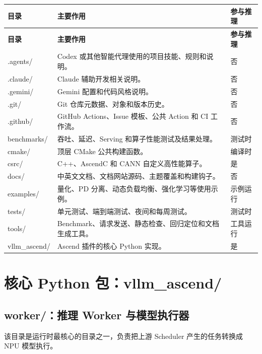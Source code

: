 \documentclass[UTF8,11pt,a4paper]{ctexart}
\DeclareRobustCommand{\folder}[1]{\texttt{\detokenize{#1}}}
\def\folder#1{#1}%
\begin{document}
\begin{longtable}{>{\raggedright\arraybackslash}p{} >{\raggedright\arraybackslash}p{} >{\centering\arraybackslash}p{}}
\toprule
\textbf{目录} & \textbf{主要作用} & \textbf{参与推理} \\
\midrule
\endfirsthead
\toprule
\textbf{目录} & \textbf{主要作用} & \textbf{参与推理} \\
\midrule
\endhead
\folder{.agents/} & Codex 或其他智能代理使用的项目技能、规则和说明。 & 否 \\
\folder{.claude/} & Claude 辅助开发相关说明。 & 否 \\
\folder{.gemini/} & Gemini 配置和代码风格说明。 & 否 \\
\folder{.git/} & Git 仓库元数据、对象和版本历史。 & 否 \\
\folder{.github/} & GitHub Actions、Issue 模板、公共 Action 和 CI 工作流。 & 否 \\
\folder{benchmarks/} & 吞吐、延迟、Serving 和算子性能测试及结果处理。 & 测试时 \\
\folder{cmake/} & 顶层 CMake 公共构建函数。 & 编译时 \\
\folder{csrc/} & C++、AscendC 和 CANN 自定义高性能算子。 & 是 \\
\folder{docs/} & 中英文文档、文档网站源码、主题覆盖和构建钩子。 & 否 \\
\folder{examples/} & 量化、PD 分离、动态负载均衡、强化学习等使用示例。 & 示例运行 \\
\folder{tests/} & 单元测试、端到端测试、夜间和每周测试。 & 测试时 \\
\folder{tools/} & Benchmark、请求发送、静态检查、回归定位和文档生成工具。 & 工具运行 \\
\folder{vllm_ascend/} & Ascend 插件的核心 Python 实现。 & 是 \\
\bottomrule
\end{longtable}

\section{核心 Python 包：\folder{vllm_ascend/}}

\subsection{\folder{worker/}：推理 Worker 与模型执行器}

该目录是运行时最核心的目录之一，负责把上游 Scheduler 产生的任务转换成 NPU 模型执行。
\end{document}
